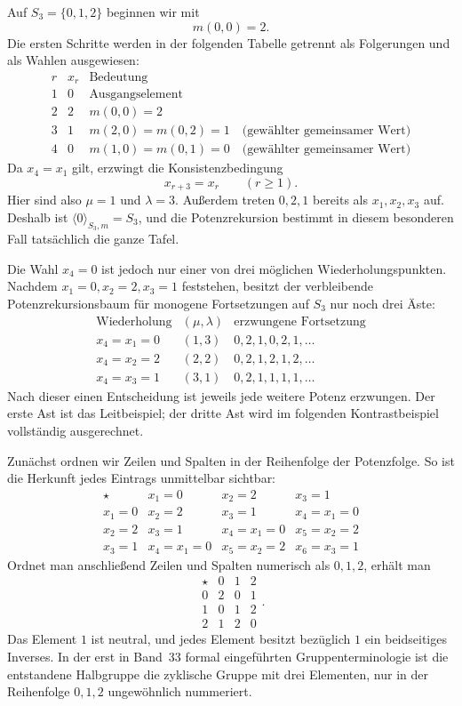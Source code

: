\documentclass[main.tex]{subfiles}
\begin{document}
Auf \(S_3=\{0,1,2\}\) beginnen wir mit
\[
  m(0,0)=2.
\]
Die ersten Schritte werden in der folgenden Tabelle getrennt als
Folgerungen und als Wahlen ausgewiesen:
\[
\begin{array}{c|c|l}
r&x_r&\text{Bedeutung}\\\hline
1&0&\text{Ausgangselement}\\
2&2&m(0,0)=2\\
3&1&m(2,0)=m(0,2)=1\quad\text{(gewählter gemeinsamer Wert)}\\
4&0&m(1,0)=m(0,1)=0\quad\text{(gewählter gemeinsamer Wert)}
\end{array}
\]
Da \(x_4=x_1\) gilt, erzwingt die Konsistenzbedingung
\[
  x_{r+3}=x_r
  \qquad(r\geq1).
\]
Hier sind also \(\mu=1\) und \(\lambda=3\).  Außerdem treten \(0,2,1\)
bereits als \(x_1,x_2,x_3\) auf.  Deshalb ist
\(\langle0\rangle_{S_3,m}=S_3\), und die Potenzrekursion bestimmt in diesem
besonderen Fall tatsächlich die ganze Tafel.

Die Wahl \(x_4=0\) ist jedoch nur einer von drei möglichen
Wiederholungspunkten.  Nachdem \(x_1=0,x_2=2,x_3=1\) feststehen, besitzt der
verbleibende Potenzrekursionsbaum für monogene Fortsetzungen auf \(S_3\) nur
noch drei Äste:
\[
\begin{array}{c|c|c}
\text{Wiederholung}&(\mu,\lambda)&\text{erzwungene Fortsetzung}\\\hline
x_4=x_1=0&(1,3)&0,2,1,0,2,1,\ldots\\
x_4=x_2=2&(2,2)&0,2,1,2,1,2,\ldots\\
x_4=x_3=1&(3,1)&0,2,1,1,1,1,\ldots
\end{array}
\]
Nach dieser einen Entscheidung ist jeweils jede weitere Potenz erzwungen.
Der erste Ast ist das Leitbeispiel; der dritte Ast wird im folgenden
Kontrastbeispiel vollständig ausgerechnet.

Zunächst ordnen wir Zeilen und Spalten in der Reihenfolge der Potenzfolge.
So ist die Herkunft jedes Eintrags unmittelbar sichtbar:
\[
\boxed{
\begin{array}{c|ccc}
\star&x_1=0&x_2=2&x_3=1\\\hline
x_1=0&x_2=2&x_3=1&x_4=x_1=0\\
x_2=2&x_3=1&x_4=x_1=0&x_5=x_2=2\\
x_3=1&x_4=x_1=0&x_5=x_2=2&x_6=x_3=1
\end{array}}
\]
Ordnet man anschließend Zeilen und Spalten numerisch als \(0,1,2\), erhält
man
\[
\begin{array}{c|ccc}
\star&0&1&2\\\hline
0&2&0&1\\
1&0&1&2\\
2&1&2&0
\end{array}.
\]
Das Element \(1\) ist neutral, und jedes Element besitzt bezüglich \(1\) ein
beidseitiges Inverses.  In der erst in Band~33 formal eingeführten
Gruppenterminologie ist die entstandene Halbgruppe die zyklische Gruppe mit
drei Elementen, nur in der Reihenfolge \(0,1,2\) ungewöhnlich nummeriert.
\end{document}
